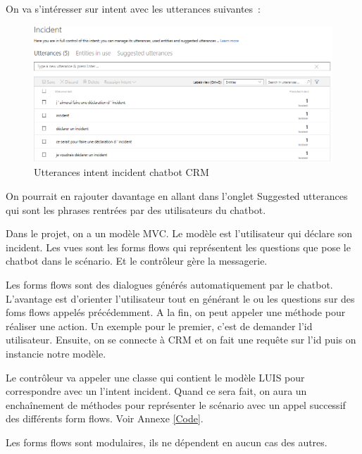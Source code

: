 On va s’intéresser sur intent avec les utterances suivantes :

\begin{figure}[H]
	\centering
		\includegraphics[width = \textwidth]{utterances.png}
	\caption{Utterances intent incident chatbot CRM}
	\label{fig:Utterances intent incident  chatbot CRM}
\end{figure}

On pourrait en rajouter davantage en allant dans l’onglet Suggested utterances qui sont les phrases rentrées par des utilisateurs du chatbot.
\vspace{1em}

Dans le projet, on a un modèle MVC. Le modèle est l’utilisateur qui déclare son incident. Les vues sont les forms flows qui représentent les questions que pose le chatbot dans le scénario. Et le contrôleur gère la messagerie.
\vspace{1em}

Les forms flows sont des dialogues générés automatiquement par le chatbot. L’avantage est d’orienter l’utilisateur tout en générant le ou les questions sur des foms flows appelés précédemment. A la fin, on peut appeler une méthode pour réaliser une action. 
Un exemple pour le premier, c’est de demander l’id utilisateur. Ensuite, on se connecte à CRM et on fait une requête sur l’id puis on instancie notre modèle.
\vspace{1em}

Le contrôleur va appeler une classe qui contient le modèle LUIS pour correspondre avec un l’intent incident. Quand ce sera fait, on aura un enchaînement de méthodes pour représenter le scénario avec un appel successif des différents form flows. Voir Annexe \ref{Code}.
\vspace{1em}

Les forms flows sont modulaires, ils ne dépendent en aucun cas des autres.
\vspace{1em}


